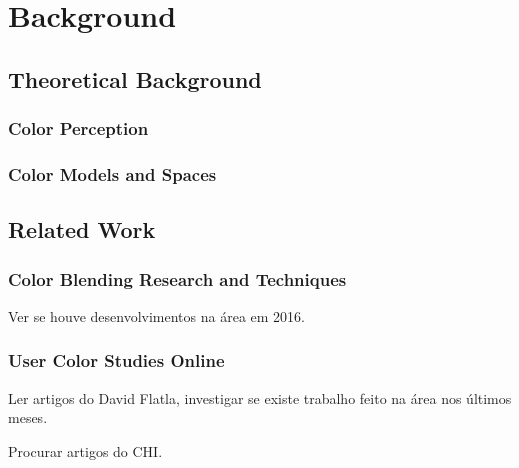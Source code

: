 
\chapter{Background}
\label{chapter:background}

\section{Theoretical Background}
\label{sec:theory_background}

\subsection{Color Perception}
\label{subsec:colorperception}

\subsection{Color Models and Spaces}
\label{subsec:colormodelspaces}

\section{Related Work}
\label{sec:related_work}

\subsection{Color Blending Research and Techniques}
\label{subsec:colorblending}
%
Ver se houve desenvolvimentos na área em 2016. \par
%
\subsection{User Color Studies Online}
\label{subsec:colorstudies}
%
Ler artigos do David Flatla, investigar se existe trabalho feito na área nos últimos meses. \par
Procurar artigos do CHI. \par
%
